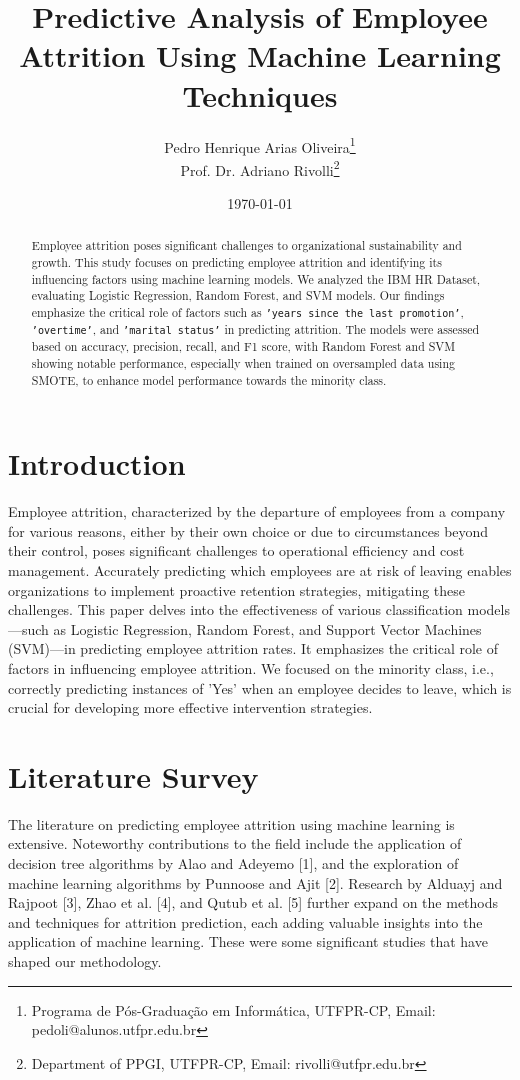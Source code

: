 \documentclass[12pt, twocolumn]{article}
\title{Predictive Analysis of Employee Attrition Using Machine Learning Techniques}
\author{
	Pedro Henrique Arias Oliveira\thanks{Programa de Pós-Graduação em Informática, UTFPR-CP, Email: pedoli@alunos.utfpr.edu.br} \\
	Prof. Dr. Adriano Rivolli\thanks{Department of PPGI, UTFPR-CP, Email: rivolli@utfpr.edu.br}
}
\date{\today} %
\begin{document}
	
	\maketitle
	
	\begin{abstract}
		Employee attrition poses significant challenges to organizational sustainability and growth. This study focuses on predicting employee attrition and identifying its influencing factors using machine learning models. We analyzed the IBM HR Dataset, evaluating Logistic Regression, Random Forest, and SVM models. Our findings emphasize the critical role of factors such as \texttt{'years since the last promotion'}, \texttt{'overtime'}, and \texttt{'marital status'} in predicting attrition. The models were assessed based on accuracy, precision, recall, and F1 score, with Random Forest and SVM showing notable performance, especially when trained on oversampled data using SMOTE, to enhance model performance towards the minority class.
	\end{abstract}
	
	\section{Introduction}
	Employee attrition, characterized by the departure of employees from a company for various reasons, either by their own choice or due to circumstances beyond their control, poses significant challenges to operational efficiency and cost management. Accurately predicting which employees are at risk of leaving enables organizations to implement proactive retention strategies, mitigating these challenges. This paper delves into the effectiveness of various classification models—such as Logistic Regression, Random Forest, and Support Vector Machines (SVM)—in predicting employee attrition rates. It emphasizes the critical role of factors in influencing employee attrition. We focused on the minority class, i.e., correctly predicting instances of 'Yes' when an employee decides to leave, which is crucial for developing more effective intervention strategies.
	
	
	\section{Literature Survey}
	The literature on predicting employee attrition using machine learning is extensive. Noteworthy contributions to the field include the application of decision tree algorithms by Alao and Adeyemo [1], and the exploration of machine learning algorithms by Punnoose and Ajit [2]. Research by Alduayj and Rajpoot [3], Zhao et al. [4], and Qutub et al. [5] further expand on the methods and techniques for attrition prediction, each adding valuable insights into the application of machine learning.
	These were some significant studies that have shaped our methodology.
	
\end{document}

